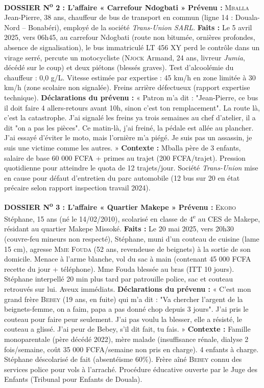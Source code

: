 \documentclass[11pt]{article}
\begin{document}
\bigskip
\noindent\textbf{DOSSIER N\textsuperscript{o} 2 : L'affaire « Carrefour Ndogbati »}
\medskip
\noindent\textbf{Prévenu :} \textsc{Mballa} Jean-Pierre, 38 ans, chauffeur de bus de transport en commun (ligne 14 : Douala-Nord -- Bonabéri), employé de la société \textit{Trans-Union SARL}.
\medskip
\noindent\textbf{Faits :} Le 5 avril 2025, vers 06h45, au carrefour Ndogbati (route non bitumée, ornières profondes, absence de signalisation), le bus immatriculé LT 456 XY perd le contrôle dans un virage serré, percute un motocycliste (\textsc{Njock} Armand, 24 ans, livreur \textit{Jumia}, décédé sur le coup) et deux piétons (blessés graves). Test d'alcoolémie du chauffeur : 0,0 g/L. Vitesse estimée par expertise : 45 km/h en zone limitée à 30 km/h (zone scolaire non signalée). Freins arrière défectueux (rapport expertise technique).
\medskip
\noindent\textbf{Déclarations du prévenu :} « Patron m'a dit : "Jean-Pierre, ce bus il doit faire 4 allers-retours avant 10h, sinon c'est ton remplacement". La route là, c'est la catastrophe. J'ai signalé les freins ya trois semaines au chef d'atelier, il a dit "on a pas les pièces". Ce matin-là, j'ai freiné, la pédale est allée au plancher. J'ai essayé d'éviter le moto, mais l'ornière m'a piégé. Je suis pas un assassin, je suis une victime comme les autres. »
\medskip
\noindent\textbf{Contexte :} Mballa père de 3 enfants, salaire de base 60 000 FCFA + primes au trajet (200 FCFA/trajet). Pression quotidienne pour atteindre le quota de 12 trajets/jour. Société \textit{Trans-Union} mise en cause pour défaut d'entretien du parc automobile (12 bus sur 20 en état précaire selon rapport inspection travail 2024).

\bigskip
\noindent\textbf{DOSSIER N\textsuperscript{o} 3 : L'affaire « Quartier Makepe »}
\medskip
\noindent\textbf{Prévenu :} \textsc{Ekobo} Stéphane, 15 ans (né le 14/02/2010), scolarisé en classe de 4\textsuperscript{e} au CES de Makepe, résidant au quartier Makepe Missoké.
\medskip
\noindent\textbf{Faits :} Le 20 mai 2025, vers 20h30 (couvre-feu mineurs non respecté), Stéphane, muni d'un couteau de cuisine (lame 15 cm), agresse \textsc{Mme Fouda} (52 ans, revendeuse de beignets) à la sortie de son domicile. Menace à l'arme blanche, vol du sac à main (contenant 45 000 FCFA recette du jour + téléphone). Mme Fouda blessée au bras (ITT 10 jours). Stéphane interpellé 20 min plus tard par patrouille police, sac et couteau retrouvés sur lui. Aveux immédiats.
\medskip
\noindent\textbf{Déclarations du prévenu :} « C'est mon grand frère \textsc{Bebey} (19 ans, en fuite) qui m'a dit : "Va chercher l'argent de la beignets-femme, on a faim, papa a pas donné chop depuis 3 jours". J'ai pris le couteau pour faire peur seulement. J'ai pas voulu la blesser, elle a résisté, le couteau a glissé. J'ai peur de Bebey, s'il dit fait, tu fais. »
\medskip
\noindent\textbf{Contexte :} Famille monoparentale (père décédé 2022), mère malade (insuffisance rénale, dialyse 2 fois/semaine, coût 35 000 FCFA/semaine non pris en charge). 4 enfants à charge. Stéphane déscolarisé de fait (absentéisme 60\%). Frère aîné \textsc{Bebey} connu des services police pour vols à l'arraché. Procédure éducative ouverte par le Juge des Enfants (Tribunal pour Enfants de Douala).
\end{document}
